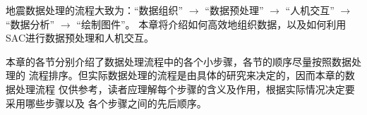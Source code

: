 地震数据处理的流程大致为：``数据组织'' $\rightarrow$ ``数据预处理''
$\rightarrow$ ``人机交互'' $\rightarrow$ ``数据分析'' $\rightarrow$ ``绘制图件''。
本章将介绍如何高效地组织数据，以及如何利用SAC进行数据预处理和人机交互。

本章的各节分别介绍了数据处理流程中的各个小步骤，各节的顺序尽量按照数据处理的
流程排序。但实际数据处理的流程是由具体的研究来决定的，因而本章的数据处理流程
仅供参考，读者应理解每个步骤的含义及作用，根据实际情况决定要采用哪些步骤以及
各个步骤之间的先后顺序。
